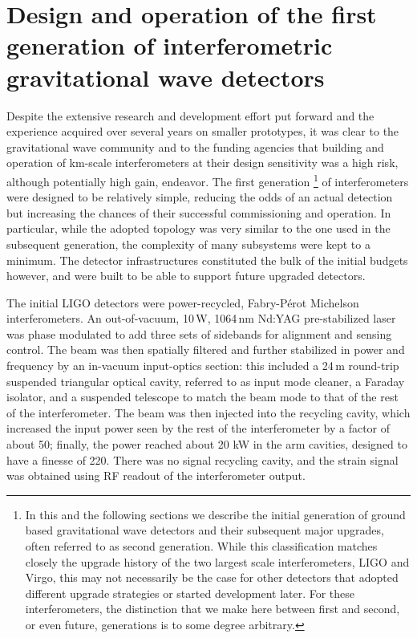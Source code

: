\section{Design and operation of the first generation of interferometric gravitational wave detectors}\label{subsec:1stgen}

Despite the extensive research and development effort put forward and the experience acquired over several years on smaller prototypes, it was clear to the gravitational wave community and to the funding agencies that building and operation of km-scale interferometers at their design sensitivity was a high risk, although potentially high gain, endeavor.
The first generation
\footnote{
In this and the following sections we describe the initial generation of ground based gravitational wave detectors and their subsequent major upgrades, often referred to as second generation. While this classification matches closely the upgrade history of the two largest scale interferometers, LIGO and Virgo, this may not necessarily be the case for other detectors that adopted different upgrade strategies or started development later. For these interferometers, the distinction that we make here between first and second, or even future, generations is to some degree arbitrary.
} 
of interferometers were designed to be relatively simple, reducing the odds of an actual detection but increasing the chances of their successful commissioning and operation.
In particular, while the adopted topology was very similar to the one used in the subsequent generation, the complexity of many subsystems were kept to a minimum.
The detector infrastructures constituted the bulk of the initial budgets however, and were built to be able to support future upgraded detectors.

The initial LIGO detectors\cite{Abbott_2004,Abbott_2009} were power-recycled, Fabry-P\'{e}rot Michelson interferometers.
An out-of-vacuum, 10\,W, 1064\,nm Nd:YAG pre-stabilized laser was phase modulated to add three sets of sidebands for alignment and sensing control.
The beam was then spatially filtered and further stabilized in power and frequency by an in-vacuum input-optics section: this included a 24\,m round-trip suspended triangular optical cavity, referred to as input mode cleaner, a Faraday isolator, and a suspended telescope to match the beam mode to that of the rest of the interferometer.
The beam was then injected into the recycling cavity,
which increased the input power seen by the rest of the interferometer by a factor of about 50; finally, the power reached about 20 kW in the arm cavities, designed to have a finesse of 220. There was no signal recycling cavity, and the strain signal was obtained using RF readout of the interferometer output.

